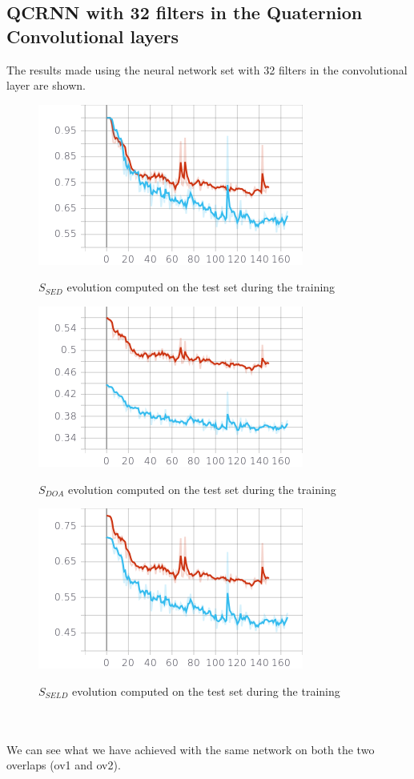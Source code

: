 \documentclass{article}
\begin{document}
	\subsection*{QCRNN with 32 filters in the Quaternion Convolutional layers}
	The results made using the neural network set with 32 filters in the convolutional layer are shown.
	\begin{figure}[hbt!]
		\centering
		\includegraphics[height=0.28\textwidth]{images/sed_score.png} \\
		\caption{$S_{SED}$ evolution computed on the test set during the training}
	\end{figure}
	\begin{figure}[hbt!]
		\centering
		\includegraphics[height=0.28\textwidth]{images/doa_score.png} \\
		\caption{$S_{DOA}$ evolution computed on the test set during the training}
	\end{figure}
	\begin{figure}[hbt!]
		\centering
		\includegraphics[height=0.28\textwidth]{images/seld_score.png}\\
		\caption{$S_{SELD}$ evolution computed on the test set during the training}
	\end{figure}
    \\ \\ We can see what we have achieved with the same network on both the two overlaps (ov1 and ov2). 
\end{document}
